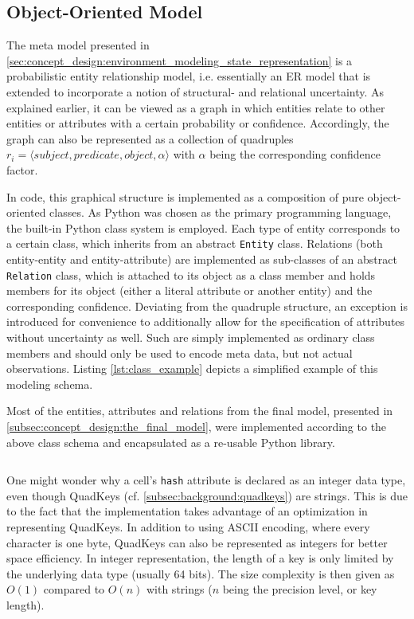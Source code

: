 \subsection{Object-Oriented Model}
\label{subsec:implementation:object_oriented_model}
The meta model presented in \cref{sec:concept_design:environment_modeling_state_representation} is a probabilistic entity relationship model, i.e. essentially an ER model that is extended to incorporate a notion of structural- and relational uncertainty. As explained earlier, it can be viewed as a graph in which entities relate to other entities or attributes with a certain probability or confidence. Accordingly, the graph can also be represented as a collection of quadruples $r_i = \langle \textit{subject}, \textit{predicate}, \textit{object}, \alpha \rangle$ with $\alpha$ being the corresponding confidence factor. 

In code, this graphical structure is implemented as a composition of pure object-oriented classes. As Python was chosen as the primary programming language, the built-in Python class system is employed. Each type of entity corresponds to a certain class, which inherits from an abstract \texttt{Entity} class. Relations (both entity-entity and entity-attribute) are implemented as sub-classes of an abstract \texttt{Relation} class, which is attached to its object as a class member and holds members for its object (either a literal attribute or another entity) and the corresponding confidence. Deviating from the quadruple structure, an exception is introduced for convenience to additionally allow for the specification of attributes without uncertainty as well. Such are simply implemented as ordinary class members and should only be used to encode meta data, but not actual observations. Listing \ref{lst:class_example} depicts a simplified example of this modeling schema.

Most of the entities, attributes and relations from the final model, presented in \cref{subsec:concept_design:the_final_model}, were implemented according to the above class schema and encapsulated as a re-usable Python library.

\begin{samepage}
\inputminted[fontsize=\footnotesize]{python}{97_listings/class_example.py}
\label{lst:class_example}
\end{samepage}

\par
\medskip
One might wonder why a cell's \texttt{hash} attribute is declared as an integer data type, even though QuadKeys (cf. \cref{subsec:background:quadkeys}) are strings. This is due to the fact that the implementation takes advantage of an optimization in representing QuadKeys. In addition to using ASCII encoding, where every character is one byte, QuadKeys can also be represented as integers for better space efficiency. In integer representation, the length of a key is only limited by the underlying data type (usually 64 bits). The size complexity is then given as $O(1)$ compared to $O(n)$ with strings ($n$ being the precision level, or key length).

